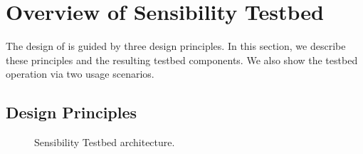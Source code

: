 \section{Overview of Sensibility Testbed}\label{sec-overview}
The design of \sysname is guided by three design principles. In this 
section, we describe these principles and the resulting testbed 
components. We also show the testbed operation via two usage 
scenarios.

\subsection{Design Principles}\label{sec-principles}

\begin{figure}
\caption{\small Sensibility Testbed architecture. \label{fig-arch}}
\end{figure}

